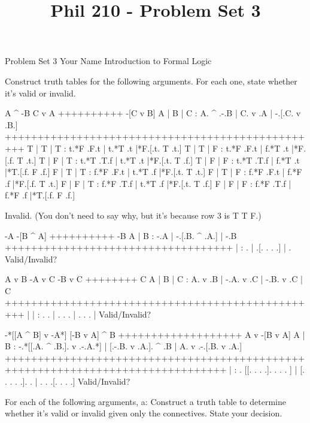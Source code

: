 
\title{Phil 210 - Problem Set 3}

\heading
Problem Set 3
Your Name
Introduction to Formal Logic
\endheading

Construct truth tables for the following arguments. For each one, state whether it's valid or invalid.

\problems
{}
\argument
 A ^ -B
 C v A
++++++++++
 -[C v B]
\endargument
        \answer
        \truthtable
         A | B | C : A. ^ .-.B | C. v .A | -.[.C. v .B.]
        +++++++++++++++++++++++++++++++++++++++++++++++++
         T | T | T : t.*F .F.t | t.*T .t |*F.[.t. T .t.]
         T | T | F : t.*F .F.t | f.*T .t |*F.[.f. T .t.]
         T | F | T : t.*T .T.f | t.*T .t |*F.[.t. T .f.]
         T | F | F : t.*T .T.f | f.*T .t |*T.[.f. F .f.]
         F | T | T : f.*F .F.t | t.*T .f |*F.[.t. T .t.]
         F | T | F : f.*F .F.t | f.*F .f |*F.[.f. T .t.]
         F | F | T : f.*F .T.f | t.*T .f |*F.[.t. T .f.]
         F | F | F : f.*F .T.f | f.*F .f |*T.[.f. F .f.]
        \endtruthtable

        Invalid. (You don't need to say why, but it's because row 3 is T T F.)
        \endanswer

\argument
 -A
 -[B ^ A]
++++++++++
 -B
\endargument
        \answer
        \truthtable
         A | B : -.A | -.[.B. ^ .A.] | -.B
        +++++++++++++++++++++++++++++++++++
           |   :  .  |  .[. .   . .] |  . 
        \endtruthtable
        Valid/Invalid?
        \endanswer

\argument
 A v B
 -A v C
 -B v C
++++++++
 C
\endargument
        \answer
        \truthtable
         A | B | C : A. v .B | -.A. v .C | -.B. v .C | C
        +++++++++++++++++++++++++++++++++++++++++++++++++
           |   |   :  .   .  |  . .   .  |  . .   .  |  
        \endtruthtable
        Valid/Invalid?
        \endanswer

\argument
 -*[[A ^ B] v -A*]
 [-B v A] ^ B
+++++++++++++++++++
 A v -[B v A]
\endargument
        \answer
        \truthtable
         A | B : -.*[[.A. ^ .B.]. v .-.A.*] | [.-.B. v .A.]. ^ .B | A. v .-.[.B. v .A.]
        ++++++++++++++++++++++++++++++++++++++++++++++++++++++++++++++++++++++++++++++++
           |   :  . [[. .   . .].   . . . ] | [. . .   . .].   .  |  .   . .[. .   . .]
        \endtruthtable
        Valid/Invalid?
        \endanswer
\endproblems

For each of the following arguments,
\list
a: Construct a truth table to determine whether it's valid or invalid given only the connectives. State your decision.

